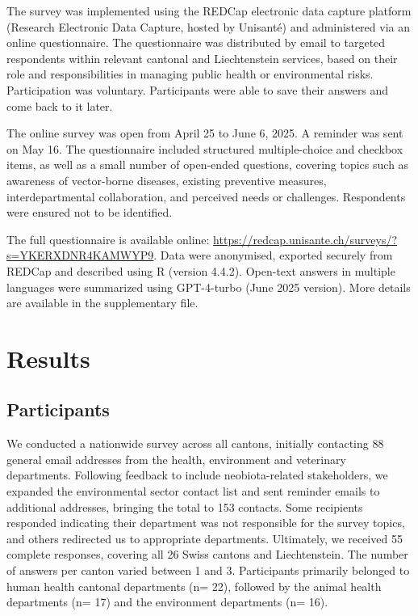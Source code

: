 \documentclass[
  11pt,
]{article}
\begin{document}
The survey was implemented using the REDCap electronic data capture
platform (Research Electronic Data Capture, hosted by Unisanté) and
administered via an online questionnaire. The questionnaire was
distributed by email to targeted respondents within relevant cantonal
and Liechtenstein services, based on their role and responsibilities in
managing public health or environmental risks. Participation was
voluntary. Participants were able to save their answers and come back to
it later.

The online survey was open from April 25 to June 6, 2025. A reminder was
sent on May 16. The questionnaire included structured multiple-choice
and checkbox items, as well as a small number of open-ended questions,
covering topics such as awareness of vector-borne diseases, existing
preventive measures, interdepartmental collaboration, and perceived
needs or challenges. Respondents were ensured not to be identified.

The full questionnaire is available online:
\url{https://redcap.unisante.ch/surveys/?s=YKERXDNR4KAMWYP9}. Data were
anonymised, exported securely from REDCap and described using R (version
4.4.2). Open-text answers in multiple languages were summarized using
GPT-4-turbo (June 2025 version). More details are available in the
supplementary file.

\section{Results}\label{results}

\subsection{Participants}\label{participants}

We conducted a nationwide survey across all cantons, initially
contacting 88 general email addresses from the health, environment and
veterinary departments. Following feedback to include neobiota-related
stakeholders, we expanded the environmental sector contact list and sent
reminder emails to additional addresses, bringing the total to 153
contacts. Some recipients responded indicating their department was not
responsible for the survey topics, and others redirected us to
appropriate departments. Ultimately, we received 55 complete responses,
covering all 26 Swiss cantons and Liechtenstein. The number of answers
per canton varied between 1 and 3. Participants primarily belonged to
human health cantonal departments (n= 22), followed by the animal health
departments (n= 17) and the environment departments (n= 16).
\end{document}
